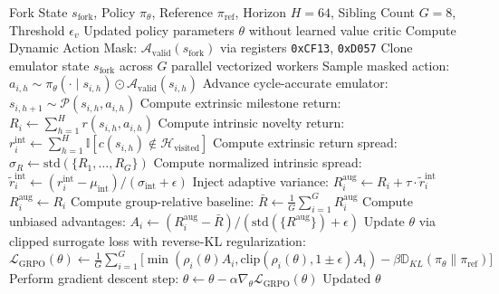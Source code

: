 \documentclass[journal,10pt,twocolumn]{IEEEtran}
\begin{document}
\begin{algorithm}[h]
\caption{Decision-Fork Critic-Free GRPO with Adaptive $\tau$-Variance}
\label{alg:grpo_variance}
\begin{algorithmic}[1]
\REQUIRE Fork State $s_{\text{fork}}$, Policy $\pi_\theta$, Reference $\pi_{\text{ref}}$, Horizon $H=64$, Sibling Count $G=8$, Threshold $\epsilon_v$
\ENSURE Updated policy parameters $\theta$ without learned value critic
\STATE Compute Dynamic Action Mask: $\mathcal{A}_{\text{valid}}(s_{\text{fork}})$ via registers \texttt{0xCF13}, \texttt{0xD057}
\STATE Clone emulator state $s_{\text{fork}}$ across $G$ parallel vectorized workers
        \STATE Sample masked action: $a_{i,h} \sim \pi_\theta(\cdot \mid s_{i,h}) \odot \mathcal{A}_{\text{valid}}(s_{i,h})$
        \STATE Advance cycle-accurate emulator: $s_{i,h+1} \sim \mathcal{P}(s_{i,h}, a_{i,h})$
    \ENDFOR
    \STATE Compute extrinsic milestone return: $R_i \leftarrow \sum_{h=1}^H r(s_{i,h}, a_{i,h})$
    \STATE Compute intrinsic novelty return: $r_i^{\text{int}} \leftarrow \sum_{h=1}^H \mathbb{I}[c(s_{i,h}) \notin \mathcal{H}_{\text{visited}}]$
\ENDFOR
\STATE Compute extrinsic return spread: $\sigma_R \leftarrow \text{std}(\{R_1, \dots, R_G\})$
    \STATE Compute normalized intrinsic spread: $\tilde{r}_i^{\text{int}} \leftarrow (r_i^{\text{int}} - \mu_{\text{int}}) / (\sigma_{\text{int}} + \epsilon)$
    \STATE Inject adaptive variance: $R_i^{\text{aug}} \leftarrow R_i + \tau \cdot \tilde{r}_i^{\text{int}}$
\ELSE
    \STATE $R_i^{\text{aug}} \leftarrow R_i$
\ENDIF
\STATE Compute group-relative baseline: $\bar{R} \leftarrow \frac{1}{G}\sum_{i=1}^G R_i^{\text{aug}}$
\STATE Compute unbiased advantages: $A_i \leftarrow (R_i^{\text{aug}} - \bar{R}) / (\text{std}(\{R^{\text{aug}}\}) + \epsilon)$
\STATE Update $\theta$ via clipped surrogate loss with reverse-KL regularization:
\STATE $\mathcal{L}_{\text{GRPO}}(\theta) \leftarrow \frac{1}{G}\sum_{i=1}^G \Big[ \min\left( \rho_i(\theta) A_i, \text{clip}(\rho_i(\theta), 1\pm\epsilon) A_i \right) - \beta \mathbb{D}_{KL}(\pi_\theta \parallel \pi_{\text{ref}}) \Big]$
\STATE Perform gradient descent step: $\theta \leftarrow \theta - \alpha \nabla_\theta \mathcal{L}_{\text{GRPO}}(\theta)$
\RETURN Updated $\theta$
\end{algorithmic}
\end{algorithm}
\end{document}

